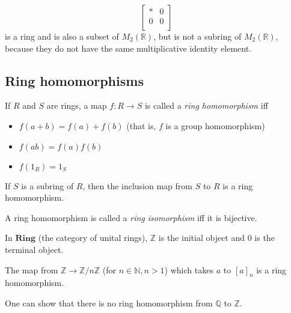 \documentclass[12pt]{article}
\begin{document}
\[ \begin{bmatrix}
    * & 0 \\
    0 & 0 \\
\end{bmatrix} \]
is a ring and is also a subset of $M_2( \mathbb{R})$, but is not a subring of $M_2( \mathbb{R})$, because they do not have the same multiplicative identity element.

\subsection{Ring homomorphisms}
If $R$ and $S$ are rings, a map $f: R \rightarrow S$ is called a \textit{ring homomorphism} iff
\begin{itemize}
    \item $f(a+b)=f(a)+f(b)$ (that is, $f$ is a group homomorphism)
    \item $f(ab)=f(a)f(b)$
    \item $f(1_R)=1_S$
\end{itemize}
If $S$ is a subring of $R$, then the inclusion map from $S$ to $R$ is a ring homomorphism.
\par
A ring homomorphism is called a \textit{ring isomorphism} iff it is bijective.
\par
In $\mathbf{Ring}$ (the category of unital rings), $\mathbb{Z}$ is the initial object and $0$ is the terminal object.
\par
The map from $ \mathbb{Z} \rightarrow \mathbb{Z}/n \mathbb{Z}$ (for $n \in \mathbb{N}, n>1$) which takes $a$ to $[a]_n$ is a ring homomorphism.
\par
One can show that there is no ring homomorphism from $ \mathbb{Q}$ to $ \mathbb{Z}$.
\end{document}
